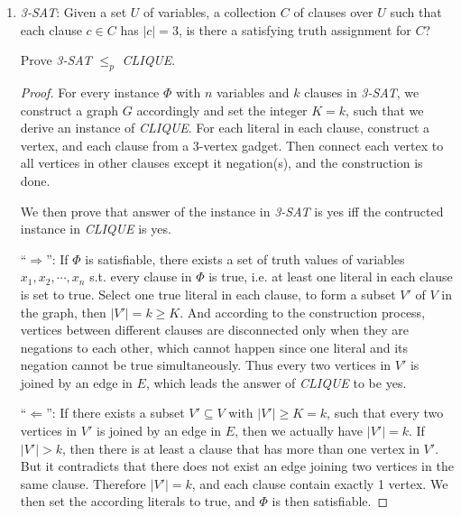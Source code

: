 \documentclass[12pt,a4paper]{article}
\theoremstyle{definition}
\begin{document}
\begin{enumerate}
\begin{proof}
            ``$\Leftarrow$'': If $A'$ is a yes instance in \emph{KNAPSACK}, we have $\sum\limits_{a \in A'}s(a) \leq B$, $\sum\limits_{a \in A'}s(a)=\sum\limits_{a \in A'}v(a)\geq K=B$, which leads to $\sum\limits_{a \in A'}s(a) = B$. Thus $A'$ is a yes instance in \emph{SUBSET SUM}.
        \end{proof}
    

    \item
    \emph{3-SAT}: Given a set $U$ of variables, a collection $C$ of clauses over $U$ such that each clause $c \in  C$ has $|c| = 3$, is there a satisfying truth assignment for $C$?

    Prove \emph{3-SAT} $\leq_p$ \emph{CLIQUE}.
\begin{proof}
    For every instance $\Phi$ with $n$ variables and $k$ clauses in \emph{3-SAT}, we construct a graph $G$ accordingly and set the integer $K=k$, such that we derive an instance of \emph{CLIQUE}. For each literal in each clause, construct a vertex, and each clause from a 3-vertex gadget. Then connect each vertex to all vertices in other clauses except it negation(s), and the construction is done.
    
    We then prove that answer of the instance in \emph{3-SAT} is yes iff the contructed instance in \emph{CLIQUE} is yes.

    ``$\Rightarrow$'': If $\Phi$ is satisfiable, there exists a set of truth values of variables $x_1,x_2,\cdots,x_n$ s.t. every clause in $\Phi$ is true, i.e. at least one literal in each clause is set to true. Select one true literal in each clause, to form a subset $V'$ of $V$ in the graph, then $|V'|=k\geq K$. And according to the construction process, vertices between different clauses are disconnected only when they are negations to each other, which cannot happen since one literal and its negation cannot be true simultaneously. Thus every two vertices in $V'$ is joined by an edge in $E$, which leads the answer of \emph{CLIQUE} to be yes.

    ``$\Leftarrow$'': If there exists a subset $V'\subseteq V$ with $|V'|\geq K=k$, such that every two vertices in $V'$ is joined by an edge in $E$, then we actually have $|V'|=k$. If $|V'|>k$, then there is at least a clause that has more than one vertex in $V'$. But it contradicts that there does not exist an edge joining two vertices in the same clause. Therefore $|V'|=k$, and each clause contain exactly 1 vertex. We then set the according literals to true, and $\Phi$ is then satisfiable.


\end{proof}
\end{enumerate}
\end{document}
